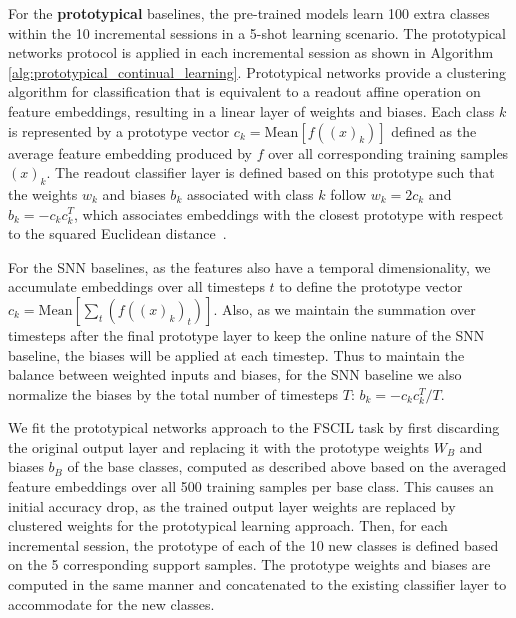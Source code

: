 For the \textbf{prototypical} baselines, the pre-trained models learn 100 extra classes within the 10 incremental sessions in a 5-shot learning scenario. The prototypical networks protocol is applied in each incremental session as shown in Algorithm \ref{alg:prototypical_continual_learning}. 
Prototypical networks provide a clustering algorithm for classification that is equivalent to a readout affine operation on feature embeddings, resulting in a linear layer of weights and biases. Each class $k$ is represented by a prototype vector $c_k = \text{Mean}[f((x)_k)]$ defined as the average feature embedding produced by $f$ over all corresponding training samples $(x)_k$. The readout classifier layer is defined based on this prototype such that the weights $w_k$ and biases $b_k$ associated with class $k$ follow $w_k = 2c_k$ and $b_k = - c_kc_k^T$, which associates embeddings with the closest prototype with respect to the squared Euclidean distance~\cite{snell2017prototypical}.

For the SNN baselines, as the features also have a temporal dimensionality, we accumulate embeddings over all timesteps $t$ to define the prototype vector $c_k = \text{Mean}[\sum_t(f((x)_k)_t)]$. Also, as we maintain the summation over timesteps after the final prototype layer to keep the online nature of the SNN baseline, the biases will be applied at each timestep. Thus to maintain the balance between weighted inputs and biases, for the SNN baseline we also normalize the biases by the total number of timesteps $T$: $b_k = - c_kc_k^T/T$.

We fit the prototypical networks approach to the FSCIL task by first discarding the original output layer and replacing it with the prototype weights $W_{B}$ and biases $b_{B}$ of the base classes, computed as described above based on the averaged feature embeddings over all 500 training samples per base class. This causes an initial accuracy drop, as the trained output layer weights are replaced by clustered weights for the prototypical learning approach.
Then, for each incremental session, the prototype of each of the 10 new classes is defined based on the 5 corresponding support samples. The prototype weights and biases are computed in the same manner and concatenated to the existing classifier layer to accommodate for the new classes. 

